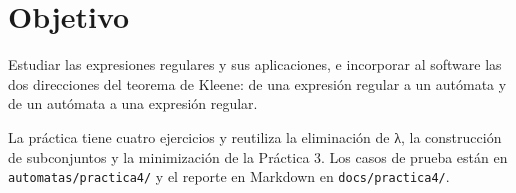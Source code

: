 \documentclass[12pt]{article}
\begin{document}


\tableofcontents
\clearpage

\section{Objetivo}
Estudiar las expresiones regulares y sus aplicaciones, e incorporar al software las dos direcciones del teorema de Kleene: de una expresión regular a un autómata y de un autómata a una expresión regular.

La práctica tiene cuatro ejercicios y reutiliza la eliminación de λ, la construcción de subconjuntos y la minimización de la Práctica 3. Los casos de prueba están en \texttt{automatas/practica4/} y el reporte en Markdown en \texttt{docs/practica4/}.







\clearpage
\printbibliography[title={Referencias}]
\end{document}
